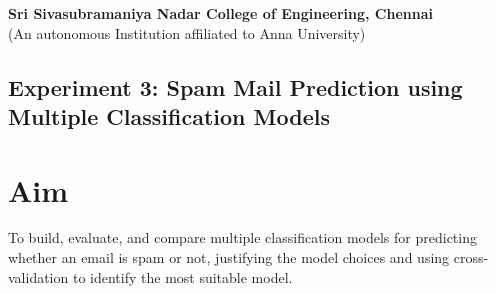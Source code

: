 \documentclass[12pt]{article}
\begin{document}
\begin{center}
    \large \textbf{Sri Sivasubramaniya Nadar College of Engineering, Chennai} \\
    (An autonomous Institution affiliated to Anna University) \\
    \vspace{1cm}
\end{center}

\begin{table}[H]
\renewcommand{\arraystretch}{1.5}
\end{table}

\vspace{1cm}

\begin{center}
 \section*{Experiment 3: Spam Mail Prediction using Multiple Classification Models}
\end{center}

\vspace{1cm}

\section{Aim}
To build, evaluate, and compare multiple classification models for predicting whether an email is spam or not, justifying the model choices and using cross-validation to identify the most suitable model.
\end{document}
